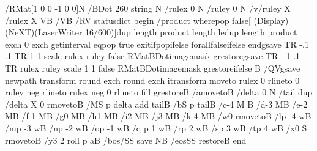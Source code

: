 /RMat[1 0 0 -1 0 0]N /BDot 260 string N /rulex 0 N /ruley 0 N /v{/ruley
X /rulex X V}B /V{}B /RV statusdict begin /product where{pop false[
(Display)(NeXT)(LaserWriter 16/600)]{dup length product length le{dup
length product exch 0 exch getinterval eq{pop true exit}if}{pop}ifelse}
forall}{false}ifelse end{{gsave TR -.1 .1 TR 1 1 scale rulex ruley false
RMat{BDot}imagemask grestore}}{{gsave TR -.1 .1 TR rulex ruley scale 1 1
false RMat{BDot}imagemask grestore}}ifelse B /QV{gsave newpath transform
round exch round exch itransform moveto rulex 0 rlineto 0 ruley neg
rlineto rulex neg 0 rlineto fill grestore}B /a{moveto}B /delta 0 N /tail
{dup /delta X 0 rmoveto}B /M{S p delta add tail}B /b{S p tail}B /c{-4 M}
B /d{-3 M}B /e{-2 M}B /f{-1 M}B /g{0 M}B /h{1 M}B /i{2 M}B /j{3 M}B /k{
4 M}B /w{0 rmoveto}B /l{p -4 w}B /m{p -3 w}B /n{p -2 w}B /o{p -1 w}B /q{
p 1 w}B /r{p 2 w}B /s{p 3 w}B /t{p 4 w}B /x{0 S rmoveto}B /y{3 2 roll p
a}B /bos{/SS save N}B /eos{SS restore}B end

